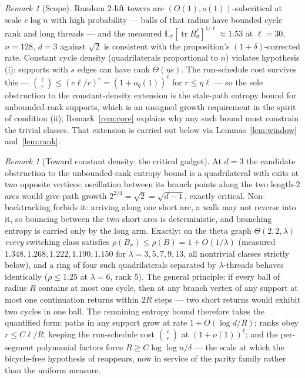 \documentclass[11pt]{article}
\theoremstyle{remark}
\newtheorem{remark}[lemma]{Remark}
\DeclareMathOperator{\tr}{tr}
\begin{document}
\begin{remark}[Scope]\label{rem:scope}
Random $2$-lift towers are $(O(1),o(1))$-subcritical at scale
$c\log n$ with high probability --- balls of that radius have bounded
cycle rank and long threads --- and the measured
$\mathbb E_\sigma[\tr B_\sigma^{\ell}]^{1/\ell}\approx1.53$ at
$\ell=30$, $n=128$, $d=3$ against $\sqrt2$ is consistent with the
proposition's $(1+\delta)$-corrected rate. Constant cycle density
(quadrilaterals proportional to $n$) violates hypothesis (i): supports
with $s$ edges can have rank $\Theta(\eta s)$. The run-schedule cost
survives this --- $\binom{\ell}{r}\le(e\ell/r)^{r}=(1+o_\eta(1))^{\ell}$
for $r\le\eta\ell$ --- so the sole obstruction to the constant-density
extension is the stale-path entropy bound for unbounded-rank supports,
which is an unsigned growth requirement in the spirit of condition
(ii); Remark~\ref{rem:core} explains why any such bound must
constrain the trivial classes. That extension is carried out below via
Lemmas~\ref{lem:window} and~\ref{lem:rank}.
\end{remark}

\begin{remark}[Toward constant density: the critical gadget]\label{rem:gadget}
At $d=3$ the candidate obstruction to the unbounded-rank entropy bound
is a quadrilateral with exits at two opposite vertices: oscillation
between its branch points along the two length-$2$ arcs would give
path growth $2^{2/4}=\sqrt2=\sqrt{d-1}$, exactly critical.
Non-backtracking forbids it: arriving along one short arc, a walk may
not reverse into it, so bouncing between the two short arcs is
deterministic, and branching entropy is carried only by the long arm.
Exactly: on the theta graph $\Theta(2,2,\lambda)$ \emph{every}
switching class satisfies $\rho(B_\sigma)\le\rho(B)=1+O(1/\lambda)$
(measured $1.348, 1.268, 1.222, 1.190, 1.150$ for
$\lambda=3,5,7,9,13$, all nontrivial classes strictly below), and a
ring of four such quadrilaterals separated by $\lambda$-threads
behaves identically ($\rho\le1.25$ at $\lambda=6$, rank $5$). The
general principle: if every ball of radius $R$ contains at most one
cycle, then at any branch vertex of any support at most one
continuation returns within $2R$ steps --- two short returns would
exhibit two cycles in one ball. The remaining entropy bound therefore
takes the quantified form: paths in any support grow at rate
$1+O(\log d/R)$; ranks obey $r\le C\ell/R$, keeping the run-schedule
cost $\binom{\ell}{r}$ at $(1+o(1))^{\ell}$; and the per-segment
polynomial factors force $R\ge C\log\log n/\delta$ --- the scale at
which the bicycle-free hypothesis of \cite{mop20} reappears, now in
service of the parity family rather than the uniform measure.
\end{remark}
\end{document}
